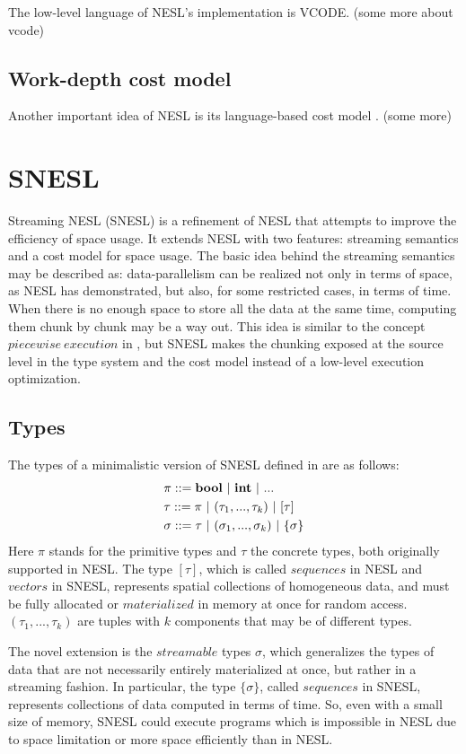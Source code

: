 The low-level language of NESL's implementation is VCODE. 
(some more about vcode)

\subsection{Work-depth cost model}
Another important idea of NESL is its language-based cost model \cite{blel96cost}. 
(some more)

\section{SNESL}
Streaming NESL (SNESL) \cite{Fphd} is a refinement of NESL
that attempts to improve the efficiency of space usage. 
It extends NESL with two features: streaming semantics and a cost model for space usage. 
The basic idea behind the streaming semantics may be described as:
data-parallelism can be realized not only in terms of space, as NESL has demonstrated, but also, for some restricted cases, in terms of time. 
When there is no enough space to store all the data at the same time, computing them chunk by chunk may be a way out.
This idea is similar to the concept $piecewise \ execution$ in \cite{palm95}, but SNESL makes the chunking exposed at the source level in the type system and the cost model instead of a low-level execution optimization.

\subsection{Types}

The types of a minimalistic version of SNESL defined in \cite{Fphd} are as follows:
\begin{align*} 
& \pi ::= \bool \ | \ \int \ | \ ...  \\
& \tau ::= \pi \ | \ (\tau_1,...,\tau_k) \ | \ [\tau]  \\
& \sigma ::= \tau \ | \ (\sigma_1,...,\sigma_k) \ | \ \tseq{\sigma}  
\end{align*}
Here $\pi$ stands for the primitive types and $\tau$ the concrete types, both originally supported in NESL.
The type $[\tau]$, which is called $sequences$ in NESL and $vectors$ in SNESL, represents spatial collections of homogeneous data, and must be
fully allocated or $materialized$ in memory at once for random access.  
$(\tau_1,...,\tau_k)$ are tuples with $k$ components that may be of different types.

The novel extension is the $streamable$ types $\sigma$, which generalizes the types of data that are not necessarily entirely materialized at once, but rather in a streaming fashion. 
In particular, the type $\{\sigma\}$, called $sequences$ in SNESL, represents collections of data computed in terms of time.
So, even with a small size of memory, SNESL could execute programs which is impossible in NESL due to space limitation or more space efficiently than in NESL. 

